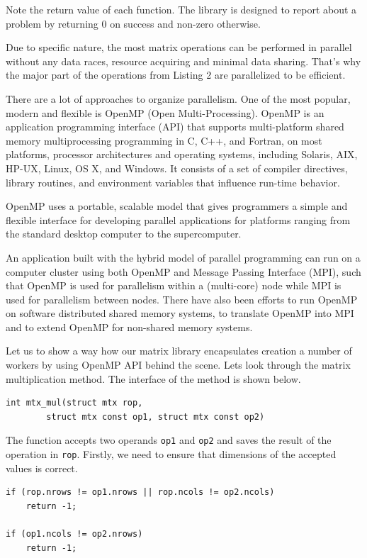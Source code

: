 \documentclass[runningheads,a4paper]{llncs}
\begin{document}
Note the return value of each function. The library is designed to report about a problem by returning 0 on success and non-zero otherwise.

Due to specific nature, the most matrix operations can be performed in parallel without any data races, resource acquiring and minimal data sharing. That's why the major part of the operations from Listing 2 are parallelized to be efficient.

There are a lot of approaches to organize parallelism. One of the most popular, modern and flexible is OpenMP (Open Multi-Processing). OpenMP is an application programming interface (API) that supports multi-platform shared memory multiprocessing programming in C, C++, and Fortran,\cite{gagne} on most platforms, processor architectures and operating systems, including Solaris, AIX, HP-UX, Linux, OS X, and Windows. It consists of a set of compiler directives, library routines, and environment variables that influence run-time behavior.

OpenMP uses a portable, scalable model that gives programmers a simple and flexible interface for developing parallel applications for platforms ranging from the standard desktop computer to the supercomputer.

An application built with the hybrid model of parallel programming can run on a computer cluster using both OpenMP and Message Passing Interface (MPI), such that OpenMP is used for parallelism within a (multi-core) node while MPI is used for parallelism between nodes. There have also been efforts to run OpenMP on software distributed shared memory systems,\cite{costa} to translate OpenMP into MPI\cite{wang,basumallik} and to extend OpenMP for non-shared memory systems.

Let us to show a way how our matrix library encapsulates creation a number of workers by using OpenMP API behind the scene. Lets look through the matrix multiplication method. The interface of the method is shown below.

\begin{verbatim}
int mtx_mul(struct mtx rop,
        struct mtx const op1, struct mtx const op2)
\end{verbatim}

The function accepts two operands \texttt{op1} and \texttt{op2} and saves the result of the operation in \texttt{rop}. Firstly, we need to ensure that dimensions of the accepted values is correct.

\begin{verbatim}
if (rop.nrows != op1.nrows || rop.ncols != op2.ncols)
    return -1;
	
if (op1.ncols != op2.nrows)
    return -1;
\end{verbatim}
\end{document}
